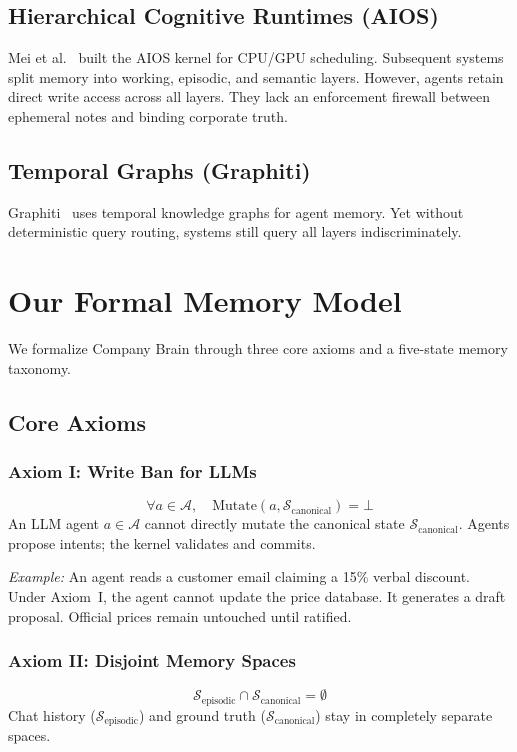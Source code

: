\documentclass[10pt,journal,compsoc]{IEEEtran}
\begin{document}
\subsection{Hierarchical Cognitive Runtimes (AIOS)}
Mei et al.~\cite{mei2024aios} built the AIOS kernel for CPU/GPU scheduling. Subsequent systems split memory into working, episodic, and semantic layers. However, agents retain direct write access across all layers. They lack an enforcement firewall between ephemeral notes and binding corporate truth.

\subsection{Temporal Graphs (Graphiti)}
Graphiti~\cite{zep2025graphiti} uses temporal knowledge graphs for agent memory. Yet without deterministic query routing, systems still query all layers indiscriminately.

\section{Our Formal Memory Model}
\label{sec:model}

We formalize Company Brain through three core axioms and a five-state memory taxonomy.

\subsection{Core Axioms}

\subsubsection{Axiom I: Write Ban for LLMs}
\begin{equation}
\forall a \in \mathcal{A}, \quad \text{Mutate}(a, \mathcal{S}_{\text{canonical}}) = \bot
\end{equation}
An LLM agent $a \in \mathcal{A}$ cannot directly mutate the canonical state $\mathcal{S}_{\text{canonical}}$. Agents propose intents; the kernel validates and commits.

\emph{Example:} An agent reads a customer email claiming a 15\% verbal discount. Under Axiom~I, the agent cannot update the price database. It generates a draft proposal. Official prices remain untouched until ratified.

\subsubsection{Axiom II: Disjoint Memory Spaces}
\begin{equation}
\mathcal{S}_{\text{episodic}} \cap \mathcal{S}_{\text{canonical}} = \emptyset
\end{equation}
Chat history ($\mathcal{S}_{\text{episodic}}$) and ground truth ($\mathcal{S}_{\text{canonical}}$) stay in completely separate spaces.
\end{document}
